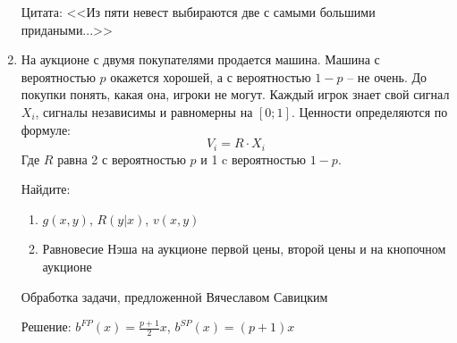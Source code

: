 \begin{enumerate}
Цитата: <<Из пяти невест выбираются две с самыми большими придаными...>>

\item На аукционе с двумя покупателями продается машина. Машина с вероятностью $p$ окажется хорошей, а с вероятностью $1-p$ -- не очень. До покупки понять, какая она, игроки не могут. Каждый игрок знает свой сигнал $X_{i}$, сигналы независимы и равномерны на $[0;1]$. Ценности определяются по формуле:
\begin{equation}
V_{i}=R\cdot X_{i}
\end{equation}
Где $R$ равна 2 с вероятностью $p$ и 1 c вероятностью $1-p$.

Найдите:
\begin{enumerate}
\item $g(x,y)$, $R(y|x)$, $v(x,y)$
\item Равновесие Нэша на аукционе первой цены, второй цены и на кнопочном аукционе
\end{enumerate}

Обработка задачи, предложенной Вячеславом Савицким

Решение: $b^{FP}(x)=\frac{p+1}{2}x$, $b^{SP}(x)=(p+1)x$


\end{enumerate}









